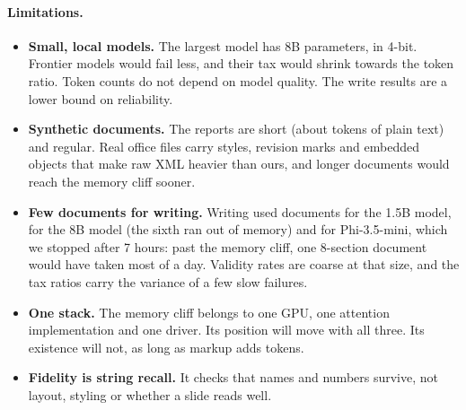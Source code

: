 \paragraph{Limitations.}
\begin{itemize}
\item \textbf{Small, local models.} The largest model has 8B parameters,
  in 4-bit. Frontier models would fail less, and their tax would shrink
  towards the token ratio. Token counts do not
  depend on model quality. The write results are a lower bound on
  reliability.
\item \textbf{Synthetic documents.} The reports are short (about
  \TxtTokens{} tokens of plain text) and regular. Real office files carry
  styles, revision marks and embedded objects that make raw XML heavier
  than ours, and longer documents would reach the memory cliff sooner.
\item \textbf{Few documents for writing.} Writing used
  \NWriteDocsQwenTwoFiveOneFiveb{} documents for the 1.5B model,
  \NWriteDocsQwenThreeEightb{} for the 8B model (the sixth ran out of
  memory) and \NWriteDocsPhiThreeFiveMini{} for Phi-3.5-mini, which we
  stopped after 7 hours: past the memory cliff, one 8-section document
  would have taken most of a day. Validity rates are coarse at that size, and the tax ratios
  carry the variance of a few slow failures.
\item \textbf{One stack.} The memory cliff belongs to one GPU, one
  attention implementation and one driver. Its position will move with
  all three. Its existence will not, as long as markup adds tokens.
\item \textbf{Fidelity is string recall.} It checks that names and numbers
  survive, not layout, styling or whether a slide reads well.
\end{itemize}
